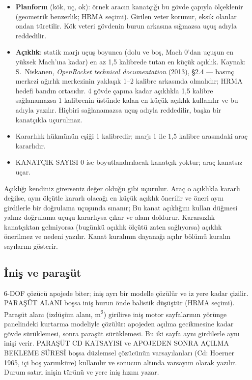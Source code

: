\documentclass[11pt,a4paper]{article}
\newcommand{\ui}[1]{\textsf{#1}}
\begin{document}
\begin{itemize}[leftmargin=1.4em]
  \item \textbf{Planform} (kök, uç, ok): örnek aracın kanatçığı bu gövde
  çapıyla ölçeklenir (geometrik benzerlik; HRMA seçimi). Girilen veter
  korunur, eksik olanlar ondan türetilir. Kök veteri gövdenin burun arkasına
  sığmazsa uçuş adıyla reddedilir.
  \item \textbf{Açıklık}: statik marjı uçuş boyunca (dolu ve boş, Mach 0'dan
  uçuşun en yüksek Mach'ına kadar) en az 1,5 kalibrede tutan en küçük
  açıklık. Kaynak: S.~Niskanen, \emph{OpenRocket technical documentation}
  (2013), §2.4 --- basınç merkezi ağırlık merkezinin yaklaşık 1--2 kalibre
  arkasında olmalıdır; HRMA hedefi bandın ortasıdır. 4 gövde çapına kadar
  açıklıkla 1,5 kalibre sağlanamazsa 1 kalibrenin üstünde kalan en küçük
  açıklık kullanılır ve bu adıyla yazılır. Hiçbiri sağlanamazsa uçuş adıyla
  reddedilir, başka bir kanatçıkla uçurulmaz.
  \item Kararlılık hükmünün eşiği 1 kalibredir; marjı 1 ile 1,5 kalibre
  arasındaki araç kararlıdır.
  \item \ui{KANATÇIK SAYISI} 0 ise boyutlandırılacak kanatçık yoktur; araç
  kanatsız uçar.
\end{itemize}

Açıklığı kendiniz girerseniz değer olduğu gibi uçurulur. Araç o açıklıkla
kararlı değilse, aynı ölçütle kararlı olacağı en küçük açıklık önerilir ve
öneri aynı girdilerle bir doğrulama uçuşunda sınanır; \ui{Bu kanat açıklığını
kullan} düğmesi yalnız doğrulama uçuşu kararlıysa çıkar ve alanı doldurur.
Kararsızlık kanatçıktan gelmiyorsa (bugünkü açıklık ölçütü zaten
sağlıyorsa) açıklık önerilmez ve nedeni yazılır. \ui{Kanat kuralının dayanağı}
açılır bölümü kuralın sayılarını gösterir.

\subsection{İniş ve paraşüt}\label{sec:saha-inis}

6-DOF çözücü apojede biter; iniş ayrı bir modelle çözülür ve iz yere kadar
çizilir. \ui{PARAŞÜT ALANI} boşsa iniş burun önde balistik düşüştür (HRMA
seçimi). Paraşüt alanı (izdüşüm alanı, m\textsuperscript{2}) girilirse iniş
motor sayfalarının yörünge panelindeki kurtarma modeliyle çözülür: apojeden
açılma gecikmesine kadar gövde sürüklemesi, sonra paraşüt sürüklemesi. Bu iki
sayfa aynı girdilerle aynı inişi verir. \ui{PARAŞÜT CD KATSAYISI} ve
\ui{APOJEDEN SONRA AÇILMA BEKLEME SÜRESİ} boşsa düzlemsel çözücünün
varsayılanları (Cd: Hoerner 1965, içi boş yarımküre) kullanılır ve sonucun
altında varsayım olarak yazılır. Durum satırı inişin türünü ve yere iniş
hızını yazar.
\end{document}
